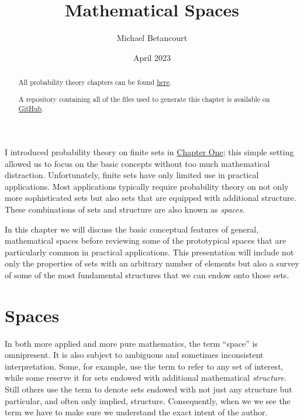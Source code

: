\documentclass[
  letterpaper,
  DIV=11,
  numbers=noendperiod]{scrartcl}
\title{Mathematical Spaces}
\author{Michael Betancourt}
\date{April 2023}
\renewcommand*\contentsname{Table of contents}
\newcommand\contentsname{Table of contents}
\begin{document}
\maketitle
\begin{abstract}
All probability theory chapters can be found
\href{http://www.symplectomorphic.com/writing/\#part1}{here}.

A repository containing all of the files used to generate this chapter
is available on
\href{https://github.com/betanalpha/quarto_chapters/tree/main/2_mathematical_spaces}{GitHub}.
\end{abstract}

\renewcommand*\contentsname{Table of contents}
{
\hypersetup{linkcolor=}
\setcounter{tocdepth}{3}
\tableofcontents
}
I introduced probability theory on finite sets in
\href{http://www.symplectomorphic.com/assets/chapters_html/probability_on_finite_sets.html}{Chapter
One}; this simple setting allowed us to focus on the basic concepts
without too much mathematical distraction. Unfortunately, finite sets
have only limited use in practical applications. Most applications
typically require probability theory on not only more sophisticated sets
but also sets that are equipped with additional structure. These
combinations of sets and structure are also known as \emph{spaces}.

In this chapter we will discuss the basic conceptual features of
general, mathematical spaces before reviewing some of the prototypical
spaces that are particularly common in practical applications. This
presentation will include not only the properties of sets with an
arbitrary number of elements but also a survey of some of the most
fundamental structures that we can endow onto those sets.

\section{Spaces}\label{spaces}

In both more applied and more pure mathematics, the term ``space'' is
omnipresent. It is also subject to ambiguous and sometimes inconsistent
interpretation. Some, for example, use the term to refer to any set of
interest, while some reserve it for sets endowed with additional
mathematical \emph{structure}. Still others use the term to denote sets
endowed with not just any structure but particular, and often only
implied, structure. Consequently, when we we see the term we have to
make sure we understand the exact intent of the author.
\end{document}
